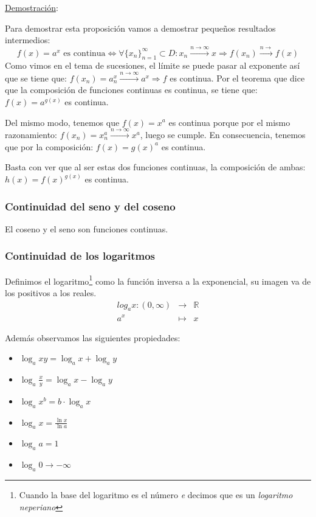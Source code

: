 \documentclass[10pt,a4paper,openright]{book}
\theoremstyle{break}
\begin{document}
\underline{Demostración}:\par
Para demostrar esta proposición vamos a demostrar pequeños resultados intermedios:
$$f(x)=a^x \mbox{ es continua} \Leftrightarrow \forall\{x_n\}_{n=1}^\infty\subset D: x_n\xrightarrow{n\rightarrow\infty} x\Rightarrow f(x_n)\xrightarrow{n\rightarrow} f(x)$$
Como vimos en el tema de sucesiones, el límite se puede pasar al exponente así que se tiene que: $f(x_n)=a^x_n\xrightarrow{n\rightarrow\infty} a^x\Rightarrow f$ es continua. Por el teorema que dice que la composición de funciones continuas es continua, se tiene que: $f(x)=a^{g(x)}$ es continua.

Del mismo modo, tenemos que $f(x)=x^a$ es continua porque por el mismo razonamiento: $f(x_n)=x_n^a\xrightarrow{n\rightarrow\infty} x^a$, luego se cumple. En consecuencia, tenemos que por la composición: $f(x)=g(x)^a$ es continua.

Basta con ver que al ser estas dos funciones continuas, la composición de ambas: $h(x)=f(x)^{g(x)}$ es continua.

\subsubsection{Continuidad del seno y del coseno}
El coseno y el seno son funciones continuas.

\subsubsection{Continuidad de los logaritmos}
Definimos el logaritmo\footnote{Cuando la base del logaritmo es el número \textit{e} decimos que es un \textit{logaritmo neperiano}} como la función inversa a la exponencial, su imagen va de los positivos a los reales.
\begin{eqnarray*} log_a x: (0,\infty) &\longrightarrow& \mathbb R \\ a^x &\longmapsto& x \end{eqnarray*}

Además observamos las siguientes propiedades:
\begin{itemize}
\item $\log_a xy = \log_a x + \log_a y$
\item $\log_a \frac{x}{y} = \log_a x - \log_a y$
\item $\log_a x^b = b\cdot \log_a x$
\item $\log_a x = \frac{\ln x}{\ln a}$
\item $\log_a a = 1$
\item $\log_a 0 \rightarrow -\infty$
\end{itemize}
\end{document}
